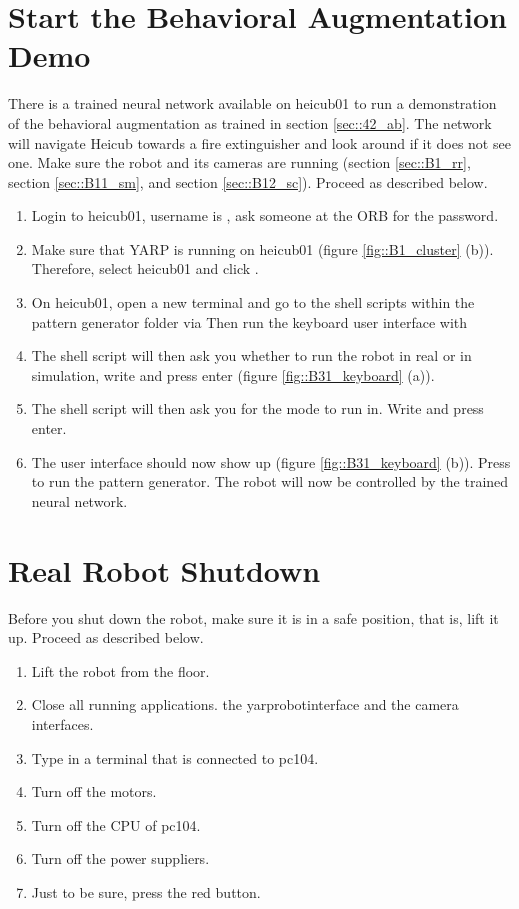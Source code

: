 \section{Start the Behavioral Augmentation Demo}
\label{sec::B4_ba}
There is a trained neural network available on heicub01 to run a demonstration of the behavioral augmentation as trained in section \ref{sec::42_ab}. The network will navigate Heicub towards a fire extinguisher and look around if it does not see one. Make sure the robot and its cameras are running (section \ref{sec::B1_rr}, section \ref{sec::B11_sm}, and section \ref{sec::B12_sc}). Proceed as described below.
\begin{enumerate}
	\item Login to heicub01, username is , ask someone at the ORB for the password.%
	\item Make sure that YARP is running on heicub01 (figure \ref{fig::B1_cluster} (b)). Therefore, select heicub01 and click .
	\item On heicub01, open a new terminal and go to the shell scripts within the pattern generator folder via \newline {}
	\newline Then run the keyboard user interface with
	\newline {}
	\item The shell script will then ask you whether to run the robot in real or in simulation, write  and press enter (figure \ref{fig::B31_keyboard} (a)).
	\item The shell script will then ask you for the mode to run in. Write  and press enter.
	\item The user interface should now show up (figure \ref{fig::B31_keyboard} (b)). Press  to run the pattern generator. The robot will now be controlled by the trained neural network.
\end{enumerate}
\FloatBarrier
\section{Real Robot Shutdown}
Before you shut down the robot, make sure it is in a safe position, that is, lift it up. Proceed as described below.
\begin{enumerate}
	\item Lift the robot from the floor.
	\item Close all running applications.  the yarprobotinterface and the camera interfaces.
	\item Type  in a terminal that is connected to pc104.
	\item Turn off the motors.
	\item Turn off the CPU of pc104.
	\item Turn off the power suppliers.
	\item Just to be sure, press the red button.
\end{enumerate}